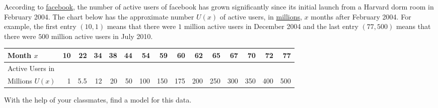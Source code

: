 \documentclass{ximera}
\begin{document}
\begin{problem}
 According to \href{http://www.facebook.com/press/info.php?timeline}{\underline{facebook}}, the number of active users of facebook has grown significantly since its initial launch from a Harvard dorm room in February 2004. The chart below has the approximate number $U(x)$ of active users, in \underline{millions}, $x$ months after February 2004.  For example, the first entry $(10, 1)$ means that there were $1$ million active users in December 2004 and the last entry $(77, 500)$ means that there were $500$ million active users in July 2010.

\begin{tabular}{|l|r|r|r|r|r|r|r|r|r|r|r|r|r|r|} \hline
Month $x$ & 10 & 22 & 34 & 38 & 44 & 54 & 59 & 60 & 62 & 65 & 67 & 70 & 72 & 77 \\ \hline 
Active Users in & & & & & & & & & & & & & & \\
Millions $U(x)$ & 1 & 5.5 & 12 & 20 & 50 & 100 & 150 & 175 & 200 & 250 & 300 & 350 & 400 & 500\\ \hline
\end{tabular}


  With the help of your classmates, find a model for this data.

\end{problem}
 
\end{document}
